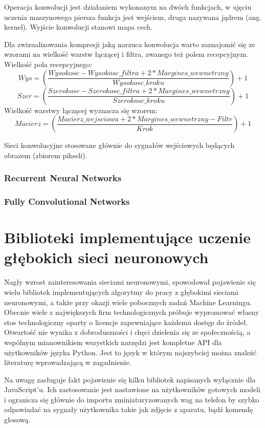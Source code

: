 \documentclass[12pt,a4paper,twoside,titlepage,openright]{book}
\begin{document}
Operacja konwolucji jest działaniem wykonanym na dwóch funkcjach, w ujęciu uczenia maszynowego piersza funkcja jest wejściem, druga nazywana jądrem (ang. kernel). Wyjście konwolucji stanowi mapa cech.


Dla zwizualizowania kompresji jaką narzuca konwolucja warto zaznajomić się ze wzorami na wielkość warstw łączącej i filtra, zwanego też polem recepcyjnym.
Wielkość pola recepcyjnego: 
$$ Wys = (\frac{Wysokosc - Wysokosc\_filtra + 2 * Margines\_wewnetrzny}{Wysokosc\_kroku}) + 1 $$ 
$$ Szer = (\frac{Szerokosc - Szerokosc\_filtra + 2 * Margines\_wewnetrzny}{Szerokosc\_kroku}) + 1 $$
Wielkość warstwy łączącej wyznacza się wzorem:
$$ Macierz = (\frac{Macierz\_wejsciowa + 2 * Margines\_wewnetrzny - Filtr}{Krok}) + 1 $$

Sieci konwolucyjne stosowane głównie do sygnałów wejściowych będących obrazem (zbiorem pikseli).


\subsection{Recurrent Neural Networks}

\subsection{Fully Convolutional Networks}


\chapter{Biblioteki implementujące uczenie głębokich sieci neuronowych}
Nagły wzrost zainteresowania sieciami neuronowymi, spowodował pojawienie się wielu bibliotek implementujących algorytmy do pracy z głębokimi sieciami neuronowymi, a także przy okazji wiele pobocznych zadań Machine Learningu. Obecnie wiele z największych firm technologicznych próbuje wypromować własny stos technologiczny oparty o licencje zapewniające każdemu dostęp do źródeł. Otwartość nie wynika z dobroduszności i chęci dzielenia się ze społecznością, a wspólnym mianownikiem wszystkich narzędzi jest kompletne API dla użytkowników języka Python. Jest to język w którym najszybciej można znaleźć literaturę wprowadzającą w zagadnienie.\cite{siteDLByLanguage}

Na uwagę zasługuje fakt pojawienie się kilku bibliotek napisanych wyłącznie dla JavaScript'u. Ich zastosowanie jest nastawione na użytkowników gotowych modeli i ogranicza się głównie do importu zminiaturyzowanych wag na telefon by szybko odpowiadać na sygnały użytkownika takie jak zdjęcie z aparatu, bądź komendę głosową. 
\end{document}
